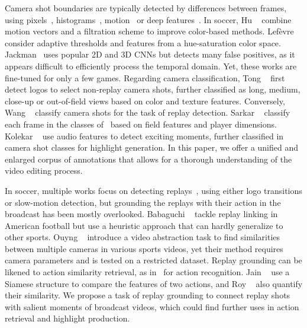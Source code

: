 \documentclass[final]{cvsports}
\begin{document}
Camera shot boundaries are typically detected by differences between frames, using pixels~\cite{Boreczky1996Comparison}, histograms~\cite{otsuji1994projection}, motion~\cite{zabih1995feature} or deep features~\cite{Abdulhussain2018MethodsAC}. 
In soccer, Hu \etal~\cite{Hu2007Enhanced} combine motion vectors and a filtration scheme to improve color-based methods. 
Lefèvre \etal~\cite{Lefvre2007EfficientAR} consider adaptive thresholds and features from a hue-saturation color space. 
Jackman~\cite{Jackman2019FootballSD} uses popular 2D and 3D CNNs but detects many false positives, as it appears difficult to efficiently process the temporal domain. Yet, these works are fine-tuned for only a few games. Regarding camera classification, Tong \etal~\cite{Tong2008Shot} first detect logos to select non-replay camera shots, further classified as long, medium, close-up or out-of-field views based on color and texture features. Conversely, Wang \etal~\cite{Wang2005SoccerRD} classify camera shots for the task of replay detection. Sarkar \etal~\cite{Sarkar2020Shot} classify each frame in the classes of~\cite{Tong2008Shot} based on field features and player dimensions. Kolekar \etal~\cite{Kolekar2015Bayesian} use audio features to detect exciting moments, further classified in camera shot classes for highlight generation.
In this paper, we offer a unified and enlarged corpus of annotations that allows for a thorough understanding of the video editing process.  



In soccer, multiple works focus on detecting replays~\cite{Sarkar2020Shot, Wang2005SoccerRD,xu2011robust,yang2008statistical,zhao2006highlight},
using either logo transitions or slow-motion detection, but grounding the replays with their action in the broadcast has been mostly overlooked. 
Babaguchi \etal~\cite{babaguchi2000linking} tackle replay linking in American football but use a heuristic approach that can hardly generalize to other sports. 
Ouyng \etal~\cite{ouyang2005replay} introduce a video abstraction task to find similarities between multiple cameras in various sports videos, yet their method requires camera parameters and is tested on a restricted dataset. 
Replay grounding can be likened to action similarity retrieval, as in~\cite{hashemi2016view,junejo2008cross} for action recognition. Jain \etal~\cite{jain2020action} use a Siamese structure to compare the features of two actions, and Roy \etal~\cite{roy2018action} also quantify their similarity.
We propose a task of replay grounding to connect replay shots with salient moments of broadcast videos, which could find further uses in action retrieval and highlight production. 
\end{document}
